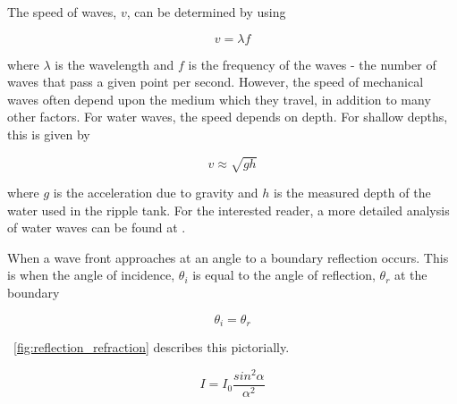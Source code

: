 \documentclass{article}
\newcommand{\figref}[2][\figurename~]{#1\ref{#2}}
\begin{document}
The speed of waves, $v$, can be determined by using 

\begin{equation}
\label{eq:wave-speed}
v = \lambda f
\end{equation}

\vspace{2mm}
\noindent
where $\lambda$ is the wavelength and $f$ is the frequency of the waves - the number of waves that pass a given point per second. However, the speed of mechanical waves often depend upon the medium which they travel, in addition to many other factors. For water waves, the speed depends on depth. For shallow depths, this is given by \cite{Book02}

\begin{equation}
\label{eq:water-waves}
v \approx \sqrt{gh}
\end{equation}

\vspace{2mm}
\noindent
where $g$ is the acceleration due to gravity and $h$ is the measured depth of the water used in the ripple tank. For the interested reader, a more detailed analysis of water waves can be found at \cite{Book02}. 

\vspace{2mm}
\noindent
When a wave front approaches at an angle to a boundary reflection occurs. This is when the angle of incidence, $\theta_i$ is equal to the angle of reflection, $\theta_r$ at the boundary

\begin{equation}
\label{eq:reflection}
\theta_i = \theta_r
\end{equation}

\vspace{2mm}
\noindent
\figref{fig:reflection_refraction} describes this pictorially.

\vspace{2mm}
\noindent




\vspace{2mm}
\noindent


\begin{equation}
\label{eq:intensity1}
I = I_0 \frac{sin^2{\alpha}}{\alpha^2}
\end{equation}
\end{document}
